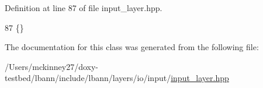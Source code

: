Definition at line 87 of file input\+\_\+layer.\+hpp.


\begin{DoxyCode}
87 \{\}
\end{DoxyCode}


The documentation for this class was generated from the following file\+:\begin{DoxyCompactItemize}
\item 
/\+Users/mckinney27/doxy-\/testbed/lbann/include/lbann/layers/io/input/\hyperlink{input__layer_8hpp}{input\+\_\+layer.\+hpp}\end{DoxyCompactItemize}
